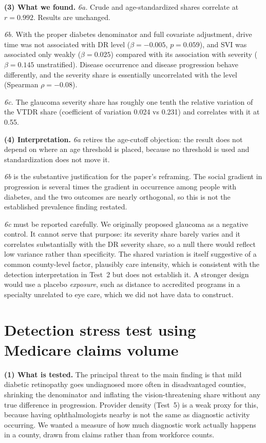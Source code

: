 \documentclass[11pt]{article}
\newcommand{\tpart}[1]{\medskip\noindent\textbf{#1}\quad}
\begin{document}
\tpart{(3) What we found.}
\emph{6a.} Crude and age-standardized shares correlate at $r = 0.992$. Results
are unchanged.

\emph{6b.} With the proper diabetes denominator and full covariate adjustment,
drive time was not associated with DR level ($\beta = -0.005$, $p = 0.059$), and
SVI was associated only weakly ($\beta = 0.025$) compared with its association
with severity ($\beta = 0.145$ unstratified). Disease occurrence and disease
progression behave differently, and the severity share is essentially
uncorrelated with the level (Spearman $\rho = -0.08$).

\emph{6c.} The glaucoma severity share has roughly one tenth the relative
variation of the VTDR share (coefficient of variation 0.024 vs 0.231) and
correlates with it at 0.55.

\tpart{(4) Interpretation.}
\emph{6a} retires the age-cutoff objection: the result does not depend on where
an age threshold is placed, because no threshold is used and standardization
does not move it.

\emph{6b} is the substantive justification for the paper's reframing. The social
gradient in progression is several times the gradient in occurrence among people
with diabetes, and the two outcomes are nearly orthogonal, so this is not the
established prevalence finding restated.

\emph{6c} must be reported carefully. We originally proposed glaucoma as a
negative control. It cannot serve that purpose: its severity share barely varies
and it correlates substantially with the DR severity share, so a null there
would reflect low variance rather than specificity. The shared variation is
itself suggestive of a common county-level factor, plausibly care intensity,
which is consistent with the detection interpretation in Test~2 but does not
establish it. A stronger design would use a placebo \emph{exposure}, such as
distance to accredited programs in a specialty unrelated to eye care, which we
did not have data to construct.

\section{Detection stress test using Medicare claims volume}

\tpart{(1) What is tested.} The principal threat to the main finding is that
mild diabetic retinopathy goes undiagnosed more often in disadvantaged counties,
shrinking the denominator and inflating the vision-threatening share without any
true difference in progression. Provider density (Test~5) is a weak proxy for
this, because having ophthalmologists nearby is not the same as diagnostic
activity occurring. We wanted a measure of how much diagnostic work actually
happens in a county, drawn from claims rather than from workforce counts.
\end{document}
